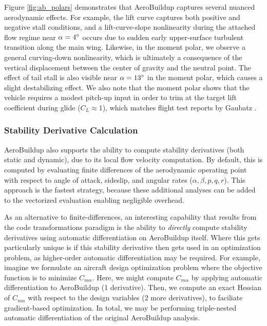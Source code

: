 Figure \ref{fig:ab_polars} demonstrates that AeroBuildup captures several nuanced aerodynamic effects. For example, the lift curve captures both positive and negative stall conditions, and a lift-curve-slope nonlinearity during the attached flow regime near $\alpha=4\degree$ occurs due to sudden early upper-surface turbulent transition along the main wing. Likewise, in the moment polar, we observe a general curving-down nonlinearity, which is ultimately a consequence of the vertical displacement between the center of gravity and the neutral point. The effect of tail stall is also visible near $\alpha=13\degree$ in the moment polar, which causes a slight destabilizing effect. We also note that the moment polar shows that the vehicle requires a modest pitch-up input in order to trim at the target lift coefficient during glide ($C_L\approx 1$), which matches flight test reports by Gaubatz \cite{gaubatz_design_2024}.

\subsubsection{Stability Derivative Calculation}

AeroBuildup also supports the ability to compute stability derivatives (both static and dynamic), due to its local flow velocity computation. By default, this is computed by evaluating finite differences of the aerodynamic operating point with respect to angle of attack, sideslip, and angular rates ($\alpha, \beta, p, q, r$). This approach is the fastest strategy, because these additional analyses can be added to the vectorized evaluation enabling negligible overhead.

As an alternative to finite-differences, an interesting capability that results from the code transformations paradigm is the ability to \emph{directly} compute stability derivatives using automatic differentiation on AeroBuildup itself. Where this gets particularly unique is if this stability derivative then gets used in an optimization problem, as higher-order automatic differentiation may be required. For example, imagine we formulate an aircraft design optimization problem where the objective function is to minimize $C_{m\alpha}$. Here, we might compute $C_{m\alpha}$ by applying automatic differentiation to AeroBuildup (1 derivative). Then, we compute an exact Hessian of $C_{m\alpha}$ with respect to the design variables (2 more derivatives), to faciliate gradient-based optimization. In total, we may be performing triple-nested automatic differentiation of the original AeroBuildup analysis.

